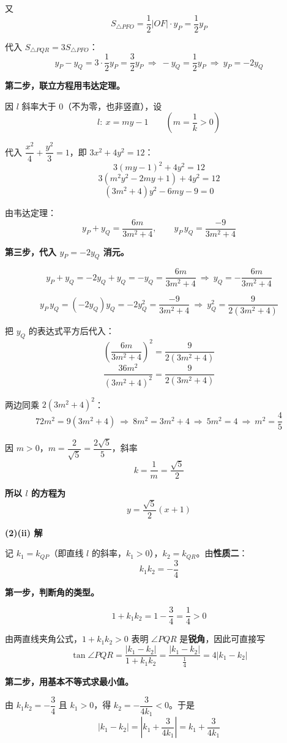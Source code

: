 又
\[S_{\triangle PFO}=\frac12|OF|\cdot y_P=\frac12 y_P\]

代入 $S_{\triangle PQR}=3S_{\triangle PFO}$：
\[y_P-y_Q=3\cdot\frac12 y_P=\frac32 y_P\ \Longrightarrow\ -y_Q=\frac12 y_P\ \Longrightarrow\ \boxed{y_P=-2y_Q}\]

\textbf{第二步，联立方程用韦达定理。}

因 $l$ 斜率大于 $0$（不为零，也非竖直），设
\[l:\ x=my-1\qquad\left(m=\frac1k>0\right)\]

代入 $\dfrac{x^2}{4}+\dfrac{y^2}{3}=1$，即 $3x^2+4y^2=12$：
\[3(my-1)^2+4y^2=12\]
\[3\left(m^2y^2-2my+1\right)+4y^2=12\]
\[\left(3m^2+4\right)y^2-6my-9=0\]

由韦达定理：
\[y_P+y_Q=\frac{6m}{3m^2+4},\qquad y_P\,y_Q=\frac{-9}{3m^2+4}\]

\textbf{第三步，代入 $y_P=-2y_Q$ 消元。}

\[y_P+y_Q=-2y_Q+y_Q=-y_Q=\frac{6m}{3m^2+4}\ \Longrightarrow\ y_Q=-\frac{6m}{3m^2+4}\]

\[y_P\,y_Q=(-2y_Q)y_Q=-2y_Q^2=\frac{-9}{3m^2+4}\ \Longrightarrow\ y_Q^2=\frac{9}{2\left(3m^2+4\right)}\]

把 $y_Q$ 的表达式平方后代入：
\[\left(\frac{6m}{3m^2+4}\right)^2=\frac{9}{2\left(3m^2+4\right)}\]
\[\frac{36m^2}{\left(3m^2+4\right)^2}=\frac{9}{2\left(3m^2+4\right)}\]

两边同乘 $2\left(3m^2+4\right)^2$：
\[72m^2=9\left(3m^2+4\right)\ \Longrightarrow\ 8m^2=3m^2+4\ \Longrightarrow\ 5m^2=4\ \Longrightarrow\ m^2=\frac45\]

因 $m>0$，$m=\dfrac{2}{\sqrt5}=\dfrac{2\sqrt5}{5}$，斜率
\[k=\frac1m=\frac{\sqrt5}{2}\]

\textbf{所以 $l$ 的方程为}
\[y=\frac{\sqrt5}{2}(x+1)\]

\par\medskip

\textbf{(2)(ii) 解}

记 $k_1=k_{QP}$（即直线 $l$ 的斜率，$k_1>0$），$k_2=k_{QR}$。由\textbf{性质二}：
\[k_1k_2=-\frac34\]

\textbf{第一步，判断角的类型。}

\[1+k_1k_2=1-\frac34=\frac14>0\]

由两直线夹角公式，$1+k_1k_2>0$ 表明 $\angle PQR$ 是\textbf{锐角}，因此可直接写
\[\tan\angle PQR=\frac{\left|k_1-k_2\right|}{1+k_1k_2}=\frac{\left|k_1-k_2\right|}{\frac14}=4\left|k_1-k_2\right|\]

\textbf{第二步，用基本不等式求最小值。}

由 $k_1k_2=-\dfrac34$ 且 $k_1>0$，得 $k_2=-\dfrac{3}{4k_1}<0$。于是
\[\left|k_1-k_2\right|=\left|k_1+\frac{3}{4k_1}\right|=k_1+\frac{3}{4k_1}\]

